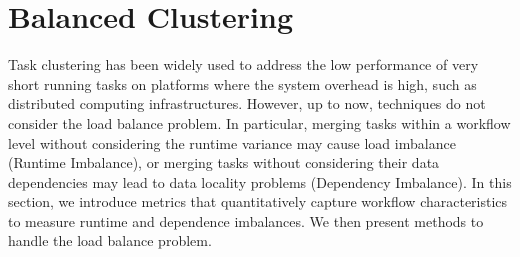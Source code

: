 \documentclass[final,5p,times,twocolumn]{elsarticle}
\begin{document}

%
%
%
%
\section{Balanced Clustering}
\label{sec:imbalance}

Task clustering has been widely used to address the low performance of very short running tasks on platforms where the system overhead is high, such as distributed computing infrastructures. However, up to now, techniques do not consider the load balance problem. In particular, merging tasks within a workflow level without considering the runtime variance may cause load imbalance (Runtime Imbalance), or merging tasks without considering their data dependencies may lead to data locality problems (Dependency Imbalance). In this section, we introduce metrics that quantitatively capture workflow characteristics to measure runtime and dependence imbalances. We then present methods to handle the load balance problem.
\end{document}
